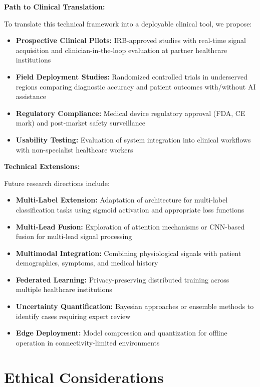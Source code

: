 \documentclass[conference]{IEEEtran}
\begin{document}
\textbf{Path to Clinical Translation:}

To translate this technical framework into a deployable clinical tool, we propose:

\begin{itemize}
\item \textbf{Prospective Clinical Pilots:} IRB-approved studies with real-time signal acquisition and clinician-in-the-loop evaluation at partner healthcare institutions
\item \textbf{Field Deployment Studies:} Randomized controlled trials in underserved regions comparing diagnostic accuracy and patient outcomes with/without AI assistance
\item \textbf{Regulatory Compliance:} Medical device regulatory approval (FDA, CE mark) and post-market safety surveillance
\item \textbf{Usability Testing:} Evaluation of system integration into clinical workflows with non-specialist healthcare workers
\end{itemize}

\textbf{Technical Extensions:}

Future research directions include:
\begin{itemize}
\item \textbf{Multi-Label Extension:} Adaptation of architecture for multi-label classification tasks using sigmoid activation and appropriate loss functions
\item \textbf{Multi-Lead Fusion:} Exploration of attention mechanisms or CNN-based fusion for multi-lead signal processing
\item \textbf{Multimodal Integration:} Combining physiological signals with patient demographics, symptoms, and medical history
\item \textbf{Federated Learning:} Privacy-preserving distributed training across multiple healthcare institutions
\item \textbf{Uncertainty Quantification:} Bayesian approaches or ensemble methods to identify cases requiring expert review
\item \textbf{Edge Deployment:} Model compression and quantization for offline operation in connectivity-limited environments
\end{itemize}

\section{Ethical Considerations}
\end{document}
